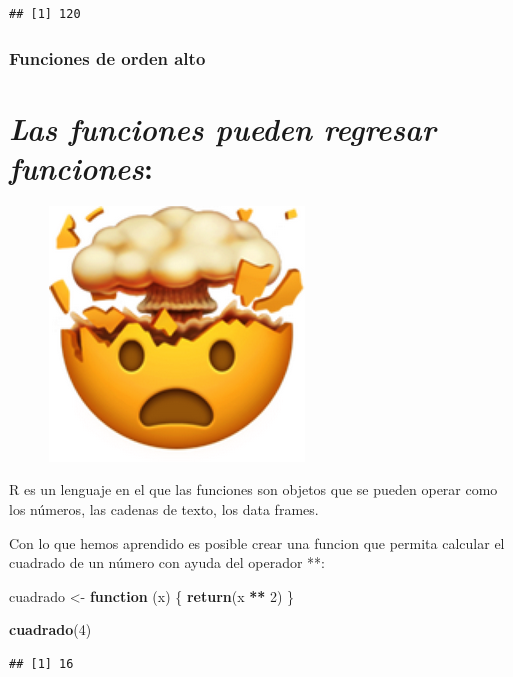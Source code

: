 \documentclass[]{book}
\newenvironment{Shaded}{\begin{snugshade}}{\end{snugshade}}
\newcommand{\KeywordTok}[1]{\textcolor[rgb]{0.13,0.29,0.53}{\textbf{#1}}}
\newcommand{\DecValTok}[1]{\textcolor[rgb]{0.00,0.00,0.81}{#1}}
\newcommand{\StringTok}[1]{\textcolor[rgb]{0.31,0.60,0.02}{#1}}
\newcommand{\ControlFlowTok}[1]{\textcolor[rgb]{0.13,0.29,0.53}{\textbf{#1}}}
\newcommand{\OperatorTok}[1]{\textcolor[rgb]{0.81,0.36,0.00}{\textbf{#1}}}
\newcommand{\NormalTok}[1]{#1}
\theoremstyle{definition}
\theoremstyle{definition}
\theoremstyle{definition}
\theoremstyle{remark}
\begin{document}
\begin{verbatim}
## [1] 120
\end{verbatim}

\subsubsection{Funciones de orden alto}\label{funciones-de-orden-alto}

\section{\texorpdfstring{\emph{Las funciones pueden regresar
funciones}:}{Las funciones pueden regresar funciones:}}\label{las-funciones-pueden-regresar-funciones}

\begin{figure}
\centering
\includegraphics{./imagenes/mind.png}
\caption{}
\end{figure}

R es un lenguaje en el que las funciones son objetos que se pueden
operar como los números, las cadenas de texto, los data frames.

Con lo que hemos aprendido es posible crear una funcion que permita
calcular el cuadrado de un número con ayuda del operador **:

\begin{Shaded}
\begin{Highlighting}[]
\NormalTok{cuadrado <-}\StringTok{ }\ControlFlowTok{function}\NormalTok{ (x) \{}
  \KeywordTok{return}\NormalTok{(x }\OperatorTok{**}\StringTok{ }\DecValTok{2}\NormalTok{)}
\NormalTok{\}}

\KeywordTok{cuadrado}\NormalTok{(}\DecValTok{4}\NormalTok{)}
\end{Highlighting}
\end{Shaded}

\begin{verbatim}
## [1] 16
\end{verbatim}
\end{document}
